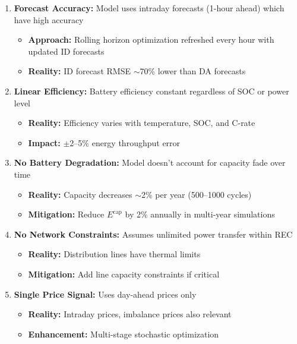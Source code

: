 \documentclass[11pt,a4paper]{article}
\begin{document}
\begin{enumerate}
    \item \textbf{Forecast Accuracy:} Model uses intraday forecasts (1-hour ahead) which have high accuracy
        \begin{itemize}
            \item \textbf{Approach:} Rolling horizon optimization refreshed every hour with updated ID forecasts
            \item \textbf{Reality:} ID forecast RMSE $\sim$70\% lower than DA forecasts
        \end{itemize}
    
    \item \textbf{Linear Efficiency:} Battery efficiency constant regardless of SOC or power level
        \begin{itemize}
            \item \textbf{Reality:} Efficiency varies with temperature, SOC, and C-rate
            \item \textbf{Impact:} $\pm$2--5\% energy throughput error
        \end{itemize}
    
    \item \textbf{No Battery Degradation:} Model doesn't account for capacity fade over time
        \begin{itemize}
            \item \textbf{Reality:} Capacity decreases $\sim$2\% per year (500--1000 cycles)
            \item \textbf{Mitigation:} Reduce $E^{\text{cap}}$ by 2\% annually in multi-year simulations
        \end{itemize}
    
    \item \textbf{No Network Constraints:} Assumes unlimited power transfer within REC
        \begin{itemize}
            \item \textbf{Reality:} Distribution lines have thermal limits
            \item \textbf{Mitigation:} Add line capacity constraints if critical
        \end{itemize}
    
    \item \textbf{Single Price Signal:} Uses day-ahead prices only
        \begin{itemize}
            \item \textbf{Reality:} Intraday prices, imbalance prices also relevant
            \item \textbf{Enhancement:} Multi-stage stochastic optimization
        \end{itemize}
\end{enumerate}
\end{document}
